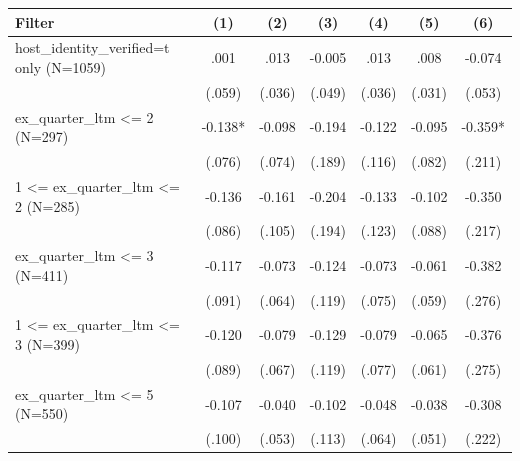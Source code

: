 \begin{tabular}{lcccccc}
\hline
Filter & (1) & (2) & (3) & (4) & (5) & (6) \\
\hline
host\_identity\_verified=t only (N=1059) & .001 & .013 & -0.005 & .013 & .008 & -0.074 \\
 & (.059) & (.036) & (.049) & (.036) & (.031) & (.053) \\
ex\_quarter\_ltm <= 2 (N=297) & -0.138* & -0.098 & -0.194 & -0.122 & -0.095 & -0.359* \\
 & (.076) & (.074) & (.189) & (.116) & (.082) & (.211) \\
1 <= ex\_quarter\_ltm <= 2 (N=285) & -0.136 & -0.161 & -0.204 & -0.133 & -0.102 & -0.350 \\
 & (.086) & (.105) & (.194) & (.123) & (.088) & (.217) \\
ex\_quarter\_ltm <= 3 (N=411) & -0.117 & -0.073 & -0.124 & -0.073 & -0.061 & -0.382 \\
 & (.091) & (.064) & (.119) & (.075) & (.059) & (.276) \\
1 <= ex\_quarter\_ltm <= 3 (N=399) & -0.120 & -0.079 & -0.129 & -0.079 & -0.065 & -0.376 \\
 & (.089) & (.067) & (.119) & (.077) & (.061) & (.275) \\
ex\_quarter\_ltm <= 5 (N=550) & -0.107 & -0.040 & -0.102 & -0.048 & -0.038 & -0.308 \\
 & (.100) & (.053) & (.113) & (.064) & (.051) & (.222) \\
\hline
\end{tabular}
